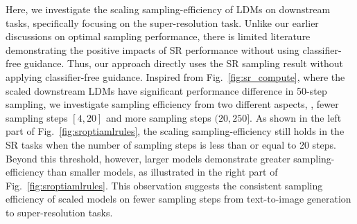 Here, we investigate the scaling sampling-efficiency of LDMs on downstream tasks, specifically focusing on the super-resolution task.
Unlike our earlier discussions on optimal sampling performance, there is limited literature demonstrating the positive impacts of SR performance without using classifier-free guidance.
Thus, our approach directly uses the SR sampling result without applying classifier-free guidance.
Inspired from Fig.~\ref{fig:sr_compute}, where the scaled downstream LDMs have significant performance difference in 50-step sampling, we investigate sampling efficiency from two different aspects, \ie, fewer sampling steps $[4, 20]$ and more sampling steps $(20, 250]$. 
As shown in the left part of Fig.~\ref{fig:sroptiamlrules}, the scaling sampling-efficiency still holds in the SR tasks when the number of sampling steps is less than or equal to 20 steps.
Beyond this threshold, however, larger models demonstrate greater sampling-efficiency than smaller models, as illustrated in the right part of Fig.~\ref{fig:sroptiamlrules}.
This observation suggests the consistent sampling efficiency of scaled models on fewer sampling steps from text-to-image generation to super-resolution tasks.


